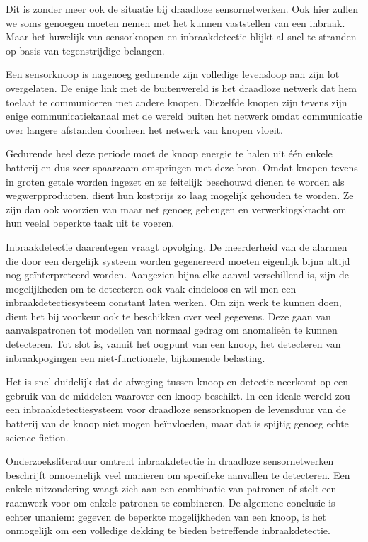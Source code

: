 \documentclass[DIV=calc,paper=a4,fontsize=11pt,twocolumn,draft]{scrartcl}
\begin{document}
Dit is zonder meer ook de situatie bij draadloze sensornetwerken. Ook hier
zullen we soms genoegen moeten nemen met het kunnen vaststellen van een
inbraak. Maar het huwelijk van sensorknopen en inbraakdetectie blijkt al snel
te stranden op basis van tegenstrijdige belangen.

Een sensorknoop is nagenoeg gedurende zijn volledige levensloop aan zijn lot
overgelaten. De enige link met de buitenwereld is het draadloze netwerk dat hem
toelaat te communiceren met andere knopen. Diezelfde knopen zijn tevens zijn
enige communicatiekanaal met de wereld buiten het netwerk omdat communicatie
over langere afstanden doorheen het netwerk van knopen vloeit.

Gedurende heel deze periode moet de knoop energie te halen uit \'e\'en enkele
batterij en dus zeer spaarzaam omspringen met deze bron. Omdat knopen tevens in
groten getale worden ingezet en ze feitelijk beschouwd dienen te worden als
wegwerpproducten, dient hun kostprijs zo laag mogelijk gehouden te worden. Ze
zijn dan ook voorzien van maar net genoeg geheugen en verwerkingskracht om hun
veelal beperkte taak uit te voeren.

Inbraakdetectie daarentegen vraagt opvolging. De meerderheid van de alarmen die
door een dergelijk systeem worden gegenereerd moeten eigenlijk bijna altijd nog
ge\"interpreteerd worden. Aangezien bijna elke aanval verschillend is, zijn de
mogelijkheden om te detecteren ook vaak eindeloos en wil men een
inbraakdetectiesysteem constant laten werken. Om zijn werk te kunnen doen,
dient het bij voorkeur ook te beschikken over veel gegevens. Deze gaan van
aanvalspatronen tot modellen van normaal gedrag om anomalie\"en te kunnen
detecteren. Tot slot is, vanuit het oogpunt van een knoop, het detecteren van
inbraakpogingen een niet-functionele, bijkomende belasting.

Het is snel duidelijk dat de afweging tussen knoop en detectie neerkomt op een
gebruik van de middelen waarover een knoop beschikt. In een ideale wereld zou
een inbraakdetectiesysteem voor draadloze sensorknopen de levensduur van de
batterij van de knoop niet mogen be\"invloeden, maar dat is spijtig genoeg
echte science fiction.

Onderzoeksliteratuur omtrent inbraakdetectie in draadloze sensornetwerken
beschrijft onnoemelijk veel manieren om specifieke aanvallen te detecteren. Een
enkele uitzondering waagt zich aan een combinatie van patronen of stelt een
raamwerk voor om enkele patronen te combineren. De algemene conclusie is echter
unaniem: gegeven de beperkte mogelijkheden van een knoop, is het onmogelijk om
een volledige dekking te bieden betreffende inbraakdetectie.
\end{document}

